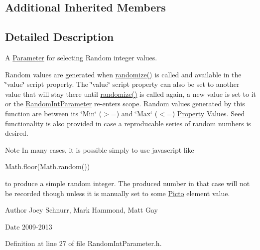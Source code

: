 \subsection*{Additional Inherited Members}


\subsection{Detailed Description}
A \hyperlink{class_picto_1_1_parameter}{Parameter} for selecting Random integer values. 

Random values are generated when \hyperlink{class_picto_1_1_random_int_parameter_a2995dcbd9542ebeb1e880c573125a962}{randomize()} is called and available in the \char`\"{}value\char`\"{} script property. The \char`\"{}value\char`\"{} script property can also be set to another value that will stay there until \hyperlink{class_picto_1_1_random_int_parameter_a2995dcbd9542ebeb1e880c573125a962}{randomize()} is called again, a new value is set to it or the \hyperlink{class_picto_1_1_random_int_parameter}{Random\-Int\-Parameter} re-\/enters scope. Random values generated by this function are between its \char`\"{}\-Min\char`\"{} ($>$=) and \char`\"{}\-Max\char`\"{} ($<$=) \hyperlink{class_picto_1_1_property}{Property} Values. Seed functionality is also provided in case a reproducable series of random numbers is desired. \begin{DoxyNote}{Note}
In many cases, it is possible simply to use javascript like
\begin{DoxyCode}
Math.floor(Math.random()) 
\end{DoxyCode}
 to produce a simple random integer. The produced number in that case will not be recorded though unless it is manually set to some \hyperlink{namespace_picto}{Picto} element value.
\end{DoxyNote}
\begin{DoxyAuthor}{Author}
Joey Schnurr, Mark Hammond, Matt Gay 
\end{DoxyAuthor}
\begin{DoxyDate}{Date}
2009-\/2013 
\end{DoxyDate}


Definition at line 27 of file Random\-Int\-Parameter.\-h.



